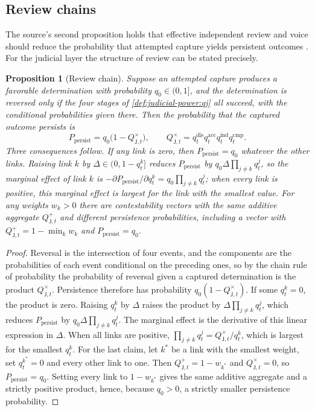 \documentclass[11pt,letterpaper]{article}
\newtheorem{proposition}[theorem]{Proposition}
\theoremstyle{definition}
\theoremstyle{remark}
\newcommand{\pJ}{\mathsf{J}}
\newcommand{\Qadd}{Q^{+}_{\pJ,t}}
\newcommand{\Qchain}{Q^{\times}_{\pJ,t}}
\begin{document}
\subsection{Review chains}

The source's second proposition holds that effective independent review and voice should reduce the probability that attempted capture yields persistent outcomes \citep{largo2026hbs}. For the judicial layer the structure of review can be stated precisely.

\begin{proposition}[Review chain]
\label{prop:judicial-power:chain}
Suppose an attempted capture produces a favorable determination with probability $q_0\in(0,1]$, and the determination is reversed only if the four stages of \cref{def:judicial-power:qj} all succeed, with the conditional probabilities given there. Then the probability that the captured outcome persists is
\[
P_{\mathrm{persist}}=q_0\big(1-\Qchain\big),\qquad \Qchain=q^{\mathrm{dis}}_tq^{\mathrm{acc}}_tq^{\mathrm{ind}}_tq^{\mathrm{cmp}}_t.
\]
Three consequences follow. If any link is zero, then $P_{\mathrm{persist}}=q_0$ whatever the other links. Raising link $k$ by $\Delta\in(0,1-q^k_t]$ reduces $P_{\mathrm{persist}}$ by $q_0\Delta\prod_{j\neq k}q^j_t$, so the marginal effect of link $k$ is $-\partial P_{\mathrm{persist}}/\partial q^k_t=q_0\prod_{j\neq k}q^j_t$; when every link is positive, this marginal effect is largest for the link with the smallest value. For any weights $w_k>0$ there are contestability vectors with the same additive aggregate $\Qadd$ and different persistence probabilities, including a vector with $\Qadd=1-\min_k w_k$ and $P_{\mathrm{persist}}=q_0$.
\end{proposition}

\begin{proof}
Reversal is the intersection of four events, and the components are the probabilities of each event conditional on the preceding ones, so by the chain rule of probability the probability of reversal given a captured determination is the product $\Qchain$. Persistence therefore has probability $q_0(1-\Qchain)$. If some $q^k_t=0$, the product is zero. Raising $q^k_t$ by $\Delta$ raises the product by $\Delta\prod_{j\neq k}q^j_t$, which reduces $P_{\mathrm{persist}}$ by $q_0\Delta\prod_{j\neq k}q^j_t$. The marginal effect is the derivative of this linear expression in $\Delta$. When all links are positive, $\prod_{j\neq k}q^j_t=\Qchain/q^k_t$, which is largest for the smallest $q^k_t$. For the last claim, let $k^{*}$ be a link with the smallest weight, set $q^{k^{*}}_t=0$ and every other link to one. Then $\Qadd=1-w_{k^{*}}$ and $\Qchain=0$, so $P_{\mathrm{persist}}=q_0$. Setting every link to $1-w_{k^{*}}$ gives the same additive aggregate and a strictly positive product, hence, because $q_0>0$, a strictly smaller persistence probability.
\end{proof}
\end{document}

